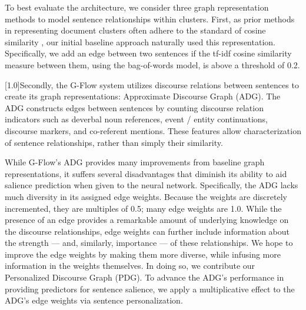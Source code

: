 \documentclass[11pt,a4paper]{article}
\begin{document}
To best evaluate the architecture, we consider three graph representation methods to model sentence relationships within clusters.
First, as prior methods in representing document clusters often adhere to the standard of cosine similarity \cite{erkan2004lexrank}, our initial baseline approach naturally used this representation. Specifically, we add an edge between two sentences if the tf-idf cosine similarity measure between them, using the bag-of-words model,
is above a threshold of 0.2.

\scalebox{0.974}[1.0]{Secondly, the G-Flow system} \cite{christensen2013towards} utilizes discourse relations between sentences to create its graph representations: Approximate Discourse Graph (ADG).
The ADG constructs edges between sentences by counting discourse relation indicators such as deverbal noun references, event \!/\! entity continuations, discourse markers, and co-referent mentions. These features allow characterization of sentence relationships, rather than simply their similarity.


While G-Flow's ADG provides many improvements from baseline graph representations, it suffers several disadvantages that diminish its ability to aid
salience prediction when given to the neural network. Specifically, the ADG lacks much diversity in its assigned edge weights. Because the weights are discretely incremented, 
they are multiples of 0.5; many edge weights are 1.0. While the presence of an edge provides a remarkable amount of underlying knowledge on the discourse relationships, edge weights can further include information about the strength 
--- and, similarly, importance --- 
of these relationships. We hope to improve the edge weights by making them more diverse, while infusing more information in the weights themselves. In doing so, we contribute our Personalized Discourse Graph (PDG).
To advance the ADG's performance in providing predictors for sentence salience, we apply a multiplicative effect to the ADG's edge weights via sentence personalization. 
\end{document}
